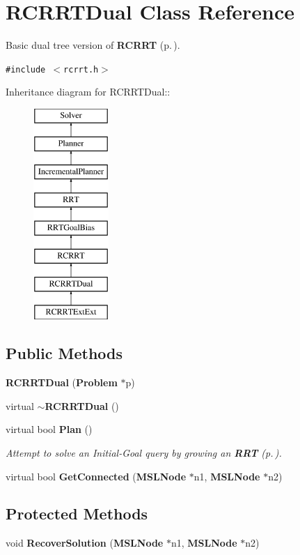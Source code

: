 \section{RCRRTDual  Class Reference}
\label{classRCRRTDual}
Basic dual tree version of {\bf RCRRT} {\rm (p.\,\pageref{classRCRRT})}. 


{\tt \#include $<$rcrrt.h$>$}

Inheritance diagram for RCRRTDual::\begin{figure}[H]
\begin{center}
\leavevmode
\includegraphics[height=8cm]{classRCRRTDual}
\end{center}
\end{figure}
\subsection*{Public Methods}
\begin{CompactItemize}
\item 
{\bf RCRRTDual} ({\bf Problem} $\ast$p)
\item 
virtual {\bf $\sim$RCRRTDual} ()
\item 
virtual bool {\bf Plan} ()
\begin{CompactList}\small\item\em Attempt to solve an Initial-Goal query by growing an {\bf RRT} {\rm (p.\,\pageref{classRRT})}.\item\end{CompactList}\item 
virtual bool {\bf Get\-Connected} ({\bf MSLNode} $\ast$n1, {\bf MSLNode} $\ast$n2)
\end{CompactItemize}
\subsection*{Protected Methods}
\begin{CompactItemize}
\item 
void {\bf Recover\-Solution} ({\bf MSLNode} $\ast$n1, {\bf MSLNode} $\ast$n2)
\end{CompactItemize}


